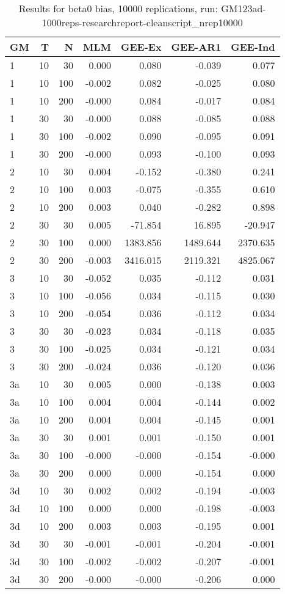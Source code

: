 \begin{table}[ht]
\centering
\begin{tabular}{lrrrrrr}
  \hline
GM & T & N & MLM & GEE-Ex & GEE-AR1 & GEE-Ind \\ 
  \hline
1 & 10 & 30 & 0.000 & 0.080 & -0.039 & 0.077 \\ 
  1 & 10 & 100 & -0.002 & 0.082 & -0.025 & 0.080 \\ 
  1 & 10 & 200 & -0.000 & 0.084 & -0.017 & 0.084 \\ 
  1 & 30 & 30 & -0.000 & 0.088 & -0.085 & 0.088 \\ 
  1 & 30 & 100 & -0.002 & 0.090 & -0.095 & 0.091 \\ 
  1 & 30 & 200 & -0.000 & 0.093 & -0.100 & 0.093 \\ 
  2 & 10 & 30 & 0.004 & -0.152 & -0.380 & 0.241 \\ 
  2 & 10 & 100 & 0.003 & -0.075 & -0.355 & 0.610 \\ 
  2 & 10 & 200 & 0.003 & 0.040 & -0.282 & 0.898 \\ 
  2 & 30 & 30 & 0.005 & -71.854 & 16.895 & -20.947 \\ 
  2 & 30 & 100 & 0.000 & 1383.856 & 1489.644 & 2370.635 \\ 
  2 & 30 & 200 & -0.003 & 3416.015 & 2119.321 & 4825.067 \\ 
  3 & 10 & 30 & -0.052 & 0.035 & -0.112 & 0.031 \\ 
  3 & 10 & 100 & -0.056 & 0.034 & -0.115 & 0.030 \\ 
  3 & 10 & 200 & -0.054 & 0.036 & -0.112 & 0.034 \\ 
  3 & 30 & 30 & -0.023 & 0.034 & -0.118 & 0.035 \\ 
  3 & 30 & 100 & -0.025 & 0.034 & -0.121 & 0.034 \\ 
  3 & 30 & 200 & -0.024 & 0.036 & -0.120 & 0.036 \\ 
  3a & 10 & 30 & 0.005 & 0.000 & -0.138 & 0.003 \\ 
  3a & 10 & 100 & 0.004 & 0.004 & -0.144 & 0.002 \\ 
  3a & 10 & 200 & 0.004 & 0.004 & -0.145 & 0.001 \\ 
  3a & 30 & 30 & 0.001 & 0.001 & -0.150 & 0.001 \\ 
  3a & 30 & 100 & -0.000 & -0.000 & -0.154 & -0.000 \\ 
  3a & 30 & 200 & 0.000 & 0.000 & -0.154 & 0.000 \\ 
  3d & 10 & 30 & 0.002 & 0.002 & -0.194 & -0.003 \\ 
  3d & 10 & 100 & 0.000 & 0.000 & -0.198 & -0.003 \\ 
  3d & 10 & 200 & 0.003 & 0.003 & -0.195 & 0.001 \\ 
  3d & 30 & 30 & -0.001 & -0.001 & -0.204 & -0.001 \\ 
  3d & 30 & 100 & -0.002 & -0.002 & -0.207 & -0.001 \\ 
  3d & 30 & 200 & -0.000 & -0.000 & -0.206 & 0.000 \\ 
   \hline
\end{tabular}
\caption{Results for beta0 bias, 10000 replications, run: GM123ad-1000reps-researchreport-cleanscript_nrep10000} 
\label{tab:beta0_bias}
\end{table}
